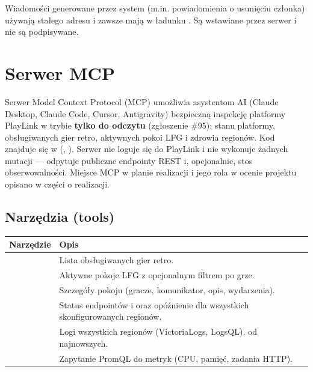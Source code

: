 Wiadomości generowane przez system (m.in. powiadomienia o usunięciu członka) używają stałego adresu
 i zawsze mają w ładunku . Są wstawiane przez serwer
i nie są podpisywane.


\chapter{Serwer MCP}
\label{ch:mcp}

Serwer Model Context Protocol (MCP) umożliwia asystentom AI (Claude Desktop, Claude Code, Cursor,
Antigravity) bezpieczną inspekcję platformy PlayLink w trybie \textbf{tylko do odczytu} (zgłoszenie \#95):
stanu platformy, obsługiwanych gier retro, aktywnych pokoi LFG i zdrowia regionów. Kod znajduje się
w  (, ). Serwer nie loguje się do PlayLink
i nie wykonuje żadnych mutacji --- odpytuje publiczne endpointy REST i, opcjonalnie, stos obserwowalności.
Miejsce MCP w planie realizacji i jego rola w ocenie projektu opisano w części o realizacji.


\section{Narzędzia (tools)}
\label{sec:mcp-tools}

\begin{tabularx}{\textwidth}{p{5.8cm}Y}
\toprule
Narzędzie & Opis \\
\midrule
{} & Lista obsługiwanych gier retro. \\
\newline{}\newline{} & Aktywne pokoje LFG z opcjonalnym filtrem po grze. \\
\newline{}\newline{} & Szczegóły pokoju (gracze, komunikator, opis, wydarzenia). \\
 & Status endpointów  i  oraz opóźnienie dla wszystkich skonfigurowanych regionów. \\
\newline{}\newline{}\newline{} & Logi wszystkich regionów (VictoriaLogs, LogsQL), od najnowszych. \\
 & Zapytanie PromQL do metryk (CPU, pamięć, zadania HTTP). \\
\bottomrule
\end{tabularx}

